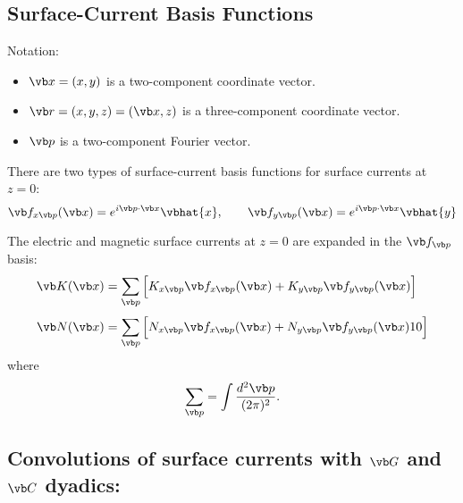 \documentclass{article}
\begin{document}
\subsection{Surface-Current Basis Functions}

Notation: 

\begin{itemize}
 \item $\vb x =(x,y)$ is a two-component coordinate vector.
 \item $\vb r =(x,y,z)=(\vb x, z)$ is a three-component coordinate vector.
 \item $\vb p  $ is a two-component Fourier vector.
\end{itemize}

There are two types of surface-current basis functions 
for surface currents at $z=0$:
$$ \vb f_{x\vb p}(\vb x) = e^{i\vb p \cdot \vb x} \vbhat{x}, \qquad
   \vb f_{y\vb p}(\vb x) = e^{i\vb p \cdot \vb x} \vbhat{y}
$$

The electric and magnetic surface currents at $z=0$ are 
expanded in the $\vb f_{\vb p}$ basis:
\begin{align*}
  \vb K(\vb x) 
&= \sum_{\vb p}
   \Big[   K_{x\vb p} \vb f_{x\vb p}(\vb x)  
         + K_{y\vb p} \vb f_{y\vb p}(\vb x)  
   \Big]
\\[3pt]
  \vb N(\vb x) 
&= \sum_{\vb p}
   \Big[   N_{x\vb p} \vb f_{x\vb p}(\vb x)  
         + N_{y\vb p} \vb f_{y\vb p}(\vb x)  10
   \Big]
\end{align*}
where  
$$ \sum_{\vb p} = \int\frac{d^2 \vb p}{(2\pi)^2}. $$

\subsection{Convolutions of surface currents with $\vb G$ and $\vb C$ dyadics:}
\end{document}
